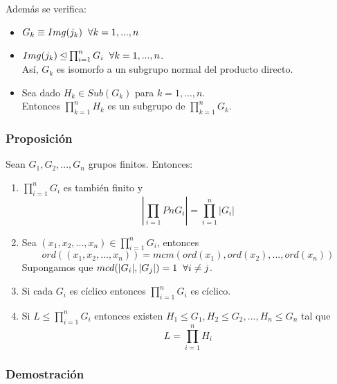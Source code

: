 \documentclass[11pt,a4paper]{article}
\begin{document}
Además se verifica:
\begin{itemize}
\item $G_{k} \equiv Img(j_{k}) \hspace{0.2cm} \forall k = 1, ..., n$
\item $Img(j_{k}) \unlhd \prod_{i=1}^{n} G_{i} \hspace{0.2cm} \forall k = 1, ..., n$. \\
Así, $G_{k}$ es isomorfo a un subgrupo normal del producto directo.
\item Sea dado $H_{k} \in Sub(G_{k})$ para $k = 1, ..., n$. \\
Entonces $\prod_{k=1}^{n} H_{k}$ es un subgrupo de $\prod_{k=1}^{n} G_{k}$.
\end{itemize}

\subsubsection*{Proposición}

Sean $G_{1}, G_{2}, ..., G_{n}$ grupos finitos. Entonces:
\begin{enumerate}[label=$(\arabic*)$]
\item $\prod_{i=1}^{n} G_{i}$ es también finito y
$$|\prod_{i=1}P{n} G_{i}| = \prod_{i=1}^{n} |G_{i}|$$
\item Sea $(x_{1}, x_{2}, ..., x_{n}) \in \prod_{i=1}^{n} G_{i}$, entonces
$$ord((x_{1}, x_{2}, ..., x_{n})) = mcm(ord(x_{1}), ord(x_{2}), ..., ord(x_{n}))$$
Supongamos que $mcd(|G_{i}|, |G_{j}|) = 1 \hspace{0.2cm} \forall i \neq j$.
\item Si cada $G_{i}$ es cíclico entonces $\prod_{i=1}^{n} G_{i}$ es cíclico.
\item Si $L \leqslant \prod_{i=1}^{n} G_{i}$ entonces existen $H_{1} \leqslant G_{1}, H_{2} \leqslant G_{2}, ..., H_{n} \leqslant G_{n}$ tal que
$$L = \prod_{i=1}^{n} H_{i}$$
\end{enumerate}

\subsubsection*{Demostración}
\end{document}
